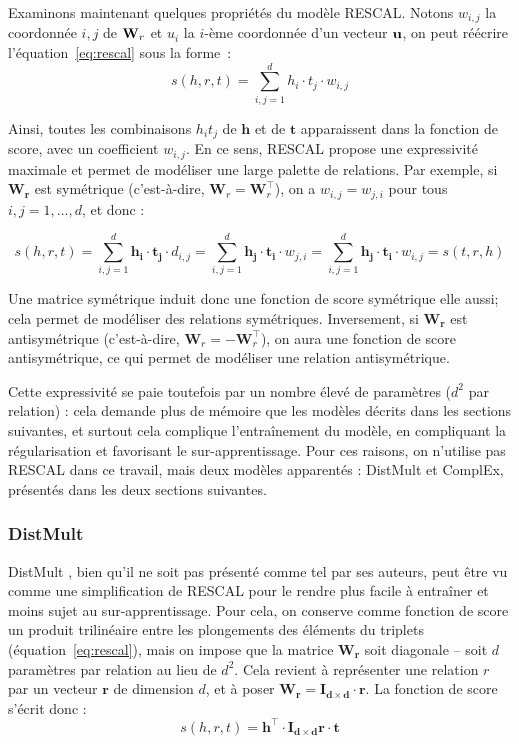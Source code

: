 Examinons maintenant quelques propriétés du modèle RESCAL. Notons $w_{i, j}$ la coordonnée $i,j$ de $\bf{W}_r$ et $u_i$ la $i$-ème coordonnée d'un vecteur $\bf{u}$, on peut réécrire l'équation~\ref{eq:rescal} sous la forme~:
\begin{equation}
    s(h, r, t) = \sum_{i, j = 1}^{d} h_i \cdot t_j \cdot w_{i, j}
\end{equation}

Ainsi, toutes les combinaisons $h_i t_j$ de $\mathbf{h}$ et de $\mathbf{t}$ apparaissent dans la fonction de score, avec un coefficient $w_{i, j}$. En ce sens, RESCAL propose une expressivité maximale et permet de modéliser une large palette de relations. Par exemple, si $\mathbf{W_r}$ est symétrique (c'est-à-dire, $\mathbf{W}_r = \mathbf{W}_r^\top$), on a $w_{i,j} = w_{j, i}$ pour tous $i, j = 1, \ldots, d$, et donc :

\begin{equation}
    s(h, r, t) = \sum_{i, j = 1}^{d} \mathbf{h_i \cdot t_j} \cdot d_{i, j}
    =  \sum_{i, j = 1}^{d} \mathbf{h_j \cdot t_i} \cdot w_{j, i}
    =  \sum_{i, j = 1}^{d} \mathbf{h_j \cdot t_i} \cdot w_{i, j}
    = s(t, r, h)
\end{equation}

Une matrice symétrique induit donc une fonction de score symétrique elle aussi; cela permet de modéliser des relations symétriques. Inversement, si $\mathbf{W_r}$ est antisymétrique (c'est-à-dire, $\mathbf{W}_r = -\mathbf{W}_r^\top$), on aura une fonction de score antisymétrique, ce qui permet de modéliser une relation antisymétrique.

Cette expressivité se paie toutefois par un nombre élevé de paramètres ($d^2$ par relation) : cela demande plus de mémoire que les modèles décrits dans les sections suivantes, et surtout cela complique l'entraînement du modèle, en compliquant la régularisation et favorisant le sur-apprentissage. Pour ces raisons, on n'utilise pas RESCAL dans ce travail, mais deux modèles apparentés : DistMult et ComplEx, présentés dans les deux sections suivantes.

\subsubsection{DistMult \cite{distmult}}

DistMult \cite{distmult}, bien qu'il ne soit pas présenté comme tel par ses auteurs, peut être vu comme une simplification de RESCAL pour le rendre plus facile à entraîner et moins sujet au sur-apprentissage. Pour cela, on conserve comme fonction de score un produit trilinéaire entre les plongements des éléments du triplets  (équation~\ref{eq:rescal}), mais on impose que la matrice $\mathbf{W_r}$ soit diagonale – soit $d$ paramètres par relation au lieu de $d^2$. Cela revient à représenter une relation $r$ par un vecteur $\mathbf{r}$ de dimension $d$, et à poser $\mathbf{W_r = I_{d\times d} \cdot r}$. La fonction de score s'écrit donc :
\begin{equation}
    \label{eq:distmult}
    s(h, r, t) = \mathbf{h^\top \cdot I_{d\times d}r \cdot t}
\end{equation}

